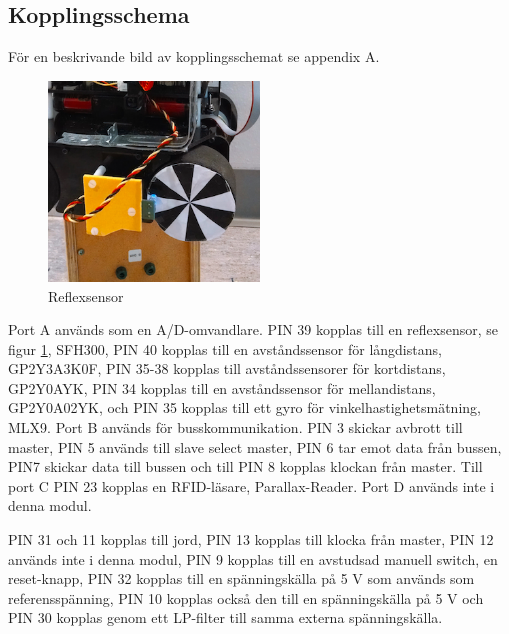 \documentclass[a4paper,12pt,fleqn]{article}
\begin{document}
\subsection{Kopplingsschema}

För en beskrivande bild av kopplingsschemat se appendix A.

\begin{figure}[htp] %
  \begin{center}
  \includegraphics[keepaspectratio=true,width=0.5\textwidth]{../Kappa/reflexsensor.png}  %
  \end{center}
  \caption{Reflexsensor} %
  \label{fig:reflex} %
\end{figure}

Port A används som en A/D-omvandlare. PIN 39 kopplas till en reflexsensor, se figur \ref{fig:reflex}, SFH300, PIN 40 kopplas till en avståndssensor för långdistans, GP\-2Y\-3A\-3K\-0F, PIN 35-38 kopplas till avståndssensorer för kortdistans, GP\-2Y\-0A\-YK, 
PIN 34 kopplas till en avståndssensor för mellandistans, GP2Y0A02YK, och PIN 35 kopplas till ett gyro för vinkelhastighetsmätning, ML\-X9. Port B används för busskommunikation. PIN 3 skickar avbrott till master, PIN 5 används till slave select master, PIN 6 tar emot data från bussen, PIN7 skickar data till bussen och till PIN 8 kopplas klockan från master. Till port C PIN 23 kopplas en RFID-läsare, Parallax-Reader. Port D används inte i denna modul. 

PIN 31 och 11 kopplas till jord, PIN 13 kopplas till klocka från master, PIN 12 används inte i denna modul, PIN 9 kopplas till en avstudsad manuell switch, en reset-knapp, PIN 32 kopplas till en spänningskälla på 5 V som används som referensspänning, PIN 10 kopplas också den till en spänningskälla på 5 V och PIN 30 kopplas genom ett LP-filter till samma externa spänningskälla.
\end{document}
